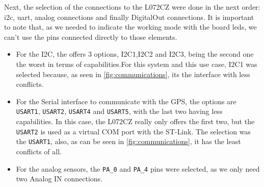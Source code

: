 Next, the selection of the connections to the L072CZ were done in the next order: \acrshort{i2c}, \acrshort{uart}, analog connections and finally DigitalOut connections. It is important to note that, as we needed to indicate the working mode with the board leds, we can't 
use the pins connected directly to those elements.
\begin{itemize}
    \item For the I2C, the  offers 3 options, I2C1,I2C2 and I2C3, being the second one the worst in terms of capabilities.For this system and this use case, I2C1 was selected because, as seen in \autoref{fig:communications}, its the interface with less conflicts.
    \item For the Serial interface to communicate with the GPS, the options are \texttt{USART1}, \texttt{USART2}, \texttt{USART4} and \texttt{USART5}, with the last two having less capabilities. In this case, the L072CZ really only offers the first two, but the \texttt{USART2} 
    is used as a virtual COM port with the ST-Link. The selection was the \texttt{USART1}, also, as can be seen in \autoref{fig:communications}, it has the least conflicts of all.
    \item For the analog sensors, the \texttt{PA\_0} and \texttt{PA\_4} pins were selected, as we only need two Analog IN connections.
\end{itemize}

